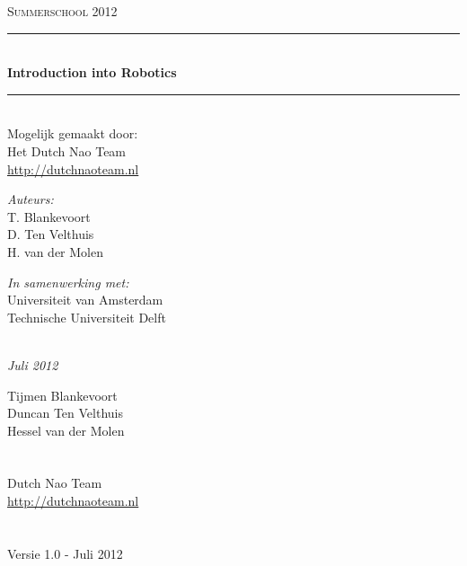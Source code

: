 \documentclass[a4paper, twoside]{article}
\newcommand{\HRule}{\rule{\linewidth}{0.5mm}}
\begin{document}
\pagestyle{empty}

\begin{titlepage}

\begin{center}

\textsc{\LARGE Summerschool 2012}\\[1.5cm]

\HRule \\[0.4cm]
{\huge \bfseries Introduction into Robotics}\\
\HRule \\[1.5cm]

{\large
Mogelijk gemaakt door:\\
Het Dutch Nao Team\\
\url{http://dutchnaoteam.nl}\\[1.5cm]}

\begin{minipage}{0.4\textwidth}
\begin{flushleft} \large
\emph{Auteurs:}\\
T. Blankevoort \\
D. Ten Velthuis \\
H. van der Molen \\
\end{flushleft}
\end{minipage}
\begin{minipage}{0.5\textwidth}
\begin{flushright} \large
\emph{In samenwerking met:} \\
Universiteit van Amsterdam\\
Technische Universiteit Delft\\
\indent \\
\end{flushright}
\end{minipage}

\vfill

{\Large \textit{Juli 2012}}
\end{center}
\end{titlepage}

\cleardoublepage
\begin{center}
Tijmen Blankevoort \\
Duncan Ten Velthuis \\
Hessel van der Molen \\
\indent \\
\indent \\
Dutch Nao Team\\
\url{http://dutchnaoteam.nl}\\
\indent \\
\indent \\
Versie 1.0 - Juli 2012\\
\indent \\
\end{center}
\end{document}
